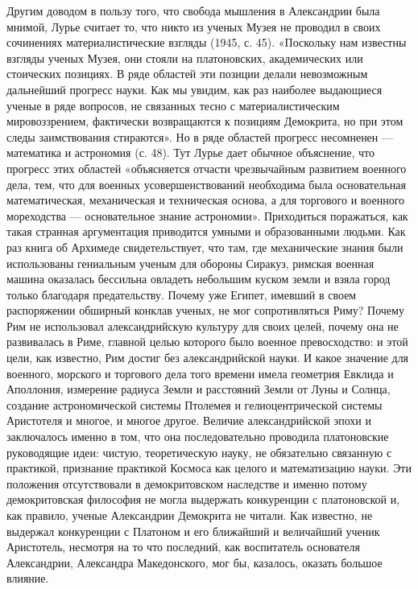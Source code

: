 Другим доводом в пользу того,  что свобода мышления в Александрии была
мнимой, Лурье  считает то,  что никто  из ученых  Музея не  проводил в
своих сочинениях материалистические взгляды  (1945, с. 45). «Поскольку
нам  известны  взгляды  ученых  Музея,  они  стояли  на  платоновских,
академических  или стоических  позициях. В  ряде областей  эти позиции
делали невозможным дальнейший  прогресс науки. Как мы  увидим, как раз
наиболее  выдающиеся ученые  в  ряде вопросов,  не  связанных тесно  с
материалистическим мировоззрением, фактически  возвращаются к позициям
Демокрита,  но при  этом  следы заимствования  стираются».  Но в  ряде
областей  прогресс несомненен  ---  математика и  астрономия (с.  48).
Тут  Лурье  дает  обычное   объяснение,  что  прогресс  этих  областей
«объясняется  отчасти  чрезвычайным   развитием  военного  дела,  тем,
что  для  военных  усовершенствований  необходима  была  основательная
математическая, механическая  и техническая основа, а  для торгового и
военного мореходства --- основательное знание астрономии». Приходиться
поражаться,  как  такая  странная  аргументация  приводится  умными  и
образованными людьми.  Как раз книга об  Архимеде свидетельствует, что
там,  где  механические  знания были  использованы  гениальным  ученым
для  обороны  Сиракуз,  римская  военная  машина  оказалась  бессильна
овладеть  небольшим  куском  земли  и  взяла  город  только  благодаря
предательству.  Почему  уже  Египет,   имевший  в  своем  распоряжении
обширный конклав  ученых, не  мог сопротивляться  Риму? Почему  Рим не
использовал александрийскую  культуру для  своих целей, почему  она не
развивалась в Риме, главной целью которого было военное превосходство:
и этой  цели, как  известно, Рим достиг  без александрийской  науки. И
какое значение  для военного, морского  и торгового дела  того времени
имела  геометрия  Евклида  и  Аполлония,  измерение  радиуса  Земли  и
расстояний Земли  от Луны  и Солнца, создание  астрономической системы
Птолемея  и гелиоцентрической  системы Аристотеля  и многое,  и многое
другое.  Величие александрийской  эпохи  и заключалось  именно в  том,
что  она  последовательно  проводила  платоновские  руководящие  идеи:
чистую,  теоретическую науку,  не обязательно  связанную с  практикой,
признание  практикой Космоса  как  целого и  математизацию науки.  Эти
положения отсутствовали  в демокритовском  наследстве и  именно потому
демокритовская философия не могла выдержать конкуренции с платоновской
и, как правило, ученые Александрии  Демокрита не читали. Как известно,
не выдержал конкуренции с Платоном и его ближайший и величайший ученик
Аристотель, несмотря  на то что последний,  как воспитатель основателя
Александрии,  Александра  Македонского,   мог  бы,  казалось,  оказать
большое влияние.

